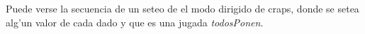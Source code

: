  { 
Puede verse la secuencia de un seteo de el modo dirigido de craps, donde se setea alg'un valor de cada dado
y que es una jugada \textit{todosPonen}.}







